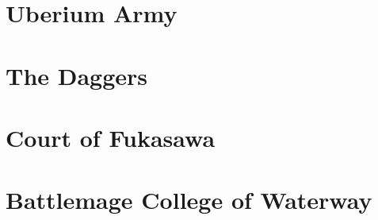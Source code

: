 



\frontmatter
\maketitle
\tableofcontents

\mainmatter%
\section{Uberium Army}
\vspace{4mm}

\clearpage\section{The Daggers}
\vspace{4mm}

\clearpage\section{Court of Fukasawa}
\vspace{4mm}

\clearpage\section{Battlemage College of Waterway}
\vspace{4mm}

